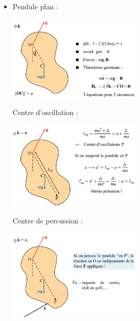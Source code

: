 \documentclass[a4paper]{article}
\begin{document}
\begin{itemize}
\item Pendule plan : 
\begin{center} \includegraphics[width=0.5\textwidth]{images/PendulePlan.PNG} \end{center}
Centre d'oscillation : 
\begin{center} \includegraphics[width=0.5\textwidth]{images/COscillation.PNG} \end{center}
Centre de percussion : 
\begin{center} \includegraphics[width=0.5\textwidth]{images/CPercussion.PNG} \end{center}





\renewcommand{\arraystretch}{2}






\end{itemize}
\end{document}
